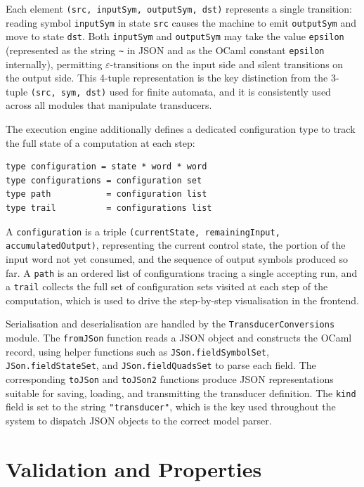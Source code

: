 Each element \texttt{(src, inputSym, outputSym, dst)} represents a single transition: reading symbol 
\texttt{inputSym} in state \texttt{src} causes the machine to emit \texttt{outputSym} and move to state 
\texttt{dst}. Both \texttt{inputSym} and \texttt{outputSym} may take the value \texttt{epsilon} 
(represented as the string \texttt{\textasciitilde} in JSON and as the OCaml constant \texttt{epsilon} internally), 
permitting $\varepsilon$-transitions on the input side and silent transitions on the output side. 
This 4-tuple representation is the key distinction from the 3-tuple \texttt{(src, sym, dst)} used for finite automata, 
and it is consistently used across all modules that manipulate transducers.

The execution engine additionally defines a dedicated configuration type to track the full state of a computation at each step:

\begin{verbatim}
type configuration = state * word * word
type configurations = configuration set
type path           = configuration list
type trail          = configurations list
\end{verbatim}

A \texttt{configuration} is a triple \texttt{(currentState, remainingInput, accumulatedOutput)}, 
representing the current control state, the portion of the input word not yet consumed, and the sequence of output symbols 
produced so far. A \texttt{path} is an ordered list of configurations tracing a single accepting run, and a \texttt{trail} 
collects the full set of configuration sets visited at each step of the computation, which is used to drive the step-by-step 
visualisation in the frontend.

Serialisation and deserialisation are handled by the \texttt{TransducerConversions} module. The \texttt{fromJSon} 
function reads a JSON object and constructs the OCaml record, using helper functions such as \texttt{JSon.fieldSymbolSet}, 
\texttt{JSon.fieldStateSet}, and \texttt{JSon.fieldQuadsSet} to parse each field. The corresponding \texttt{toJSon} and 
\texttt{toJSon2} functions produce JSON representations suitable for saving, loading, and transmitting the transducer definition. 
The \texttt{kind} field is set to the string \texttt{"transducer"}, which is the key used throughout the system to dispatch 
JSON objects to the correct model parser.

\section{Validation and Properties}
\label{sec:back_validation}

